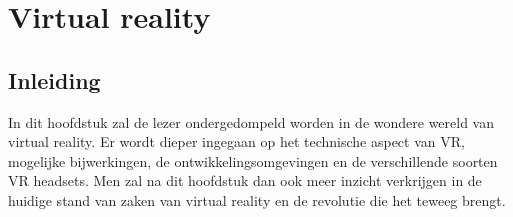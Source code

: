 \chapter{Virtual reality}
\label{ch:stand-van-zaken}




%


\section{Inleiding}
In dit hoofdstuk zal de lezer ondergedompeld worden in de wondere wereld van virtual reality. Er wordt dieper ingegaan op het technische aspect van VR, mogelijke bijwerkingen, de ontwikkelingsomgevingen en de verschillende soorten VR headsets. Men zal na dit hoofdstuk dan ook meer inzicht verkrijgen in de huidige stand van zaken van virtual reality en de revolutie die het teweeg brengt.

